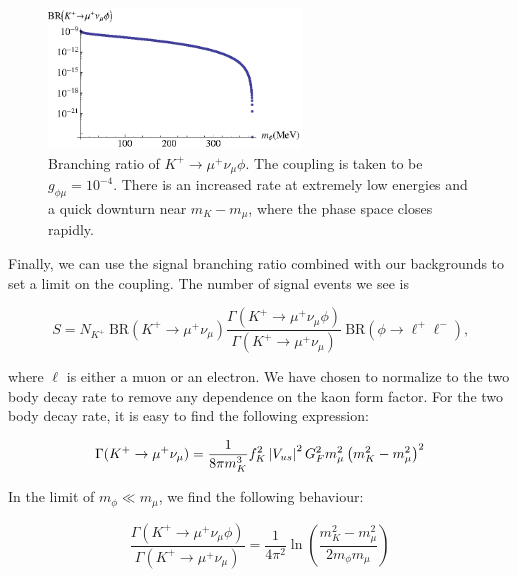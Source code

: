 \begin{figure}[h]
    \centering
    \includegraphics[width=0.6\textwidth]{Figures/kaon/kaon_br}
    \caption[Branching ratio of $K^+ \rightarrow \mu^+ \nu_\mu \phi$.]{Branching ratio of $K^+ \rightarrow \mu^+ \nu_\mu \phi$. The coupling is taken to be $g_{\phi\mu} = 10^{-4}$. There is an increased rate at extremely low energies and a quick downturn near $m_K - m_\mu$, where the phase space closes rapidly.}
    \label{fig:kaon_br}
\end{figure}

Finally, we can use the signal branching ratio combined with our backgrounds to set a limit on the coupling.
The number of signal events we see is

\begin{equation}
    S = N_{K^+}~\textrm{BR}(K^+ \rightarrow \mu^+ \nu_\mu) \frac{\Gamma(K^+ \rightarrow \mu^+ \nu_\mu \phi)}{\Gamma(K^+ \rightarrow \mu^+ \nu_\mu)}~\textrm{BR}(\phi \rightarrow \ell^+ \ell^-)\textrm{,}
    \label{eqn:kaon_signal}
\end{equation}

\noindent where $\ell$ is either a muon or an electron.
We have chosen to normalize to the two body decay rate to remove any dependence on the kaon form factor.
For the two body decay rate, it is easy to find the following expression:

\begin{equation}
    \Gamma(K^+ \rightarrow \mu^+ \nu_\mu) = \frac{1}{8\pi m_K^3}\mathnormal{f}_K^2 \left|V_{us}\right|^2 G_F^2 m_\mu^2 \left(m_K^2 - m_\mu^2\right)^2
\end{equation}

\noindent In the limit of $m_\phi \ll m_\mu$, we find the following behaviour:

\begin{equation}
    \frac{\Gamma(K^+ \rightarrow \mu^+ \nu_\mu \phi)}{\Gamma(K^+ \rightarrow \mu^+ \nu_\mu)} = \frac{1}{4\pi^2} \ln\left(\frac{m_K^2 - m_\mu^2}{2 m_\phi m_\mu} \right)
\end{equation}

